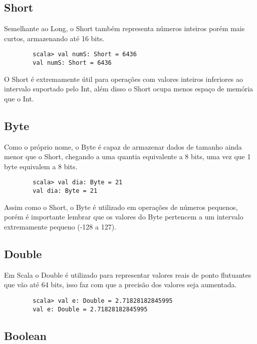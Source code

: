 	\subsection{Short}
	
	Semelhante ao Long, o Short tamb\'{e}m representa n\'{u}meros inteiros por\'{e}m mais curtos, armazenando at\'{e} 16 bits.
	
	\begin{lstlisting}
		scala> val numS: Short = 6436
		val numS: Short = 6436
	\end{lstlisting}

	O Short \'{e} extremamente útil para opera\c{c}\~{o}es com valores inteiros inferiores ao intervalo suportado pelo Int, al\'{e}m disso o Short ocupa menos espaço de mem\'{o}ria que o Int.
    
    \subsection{Byte}
    
    Como o próprio nome, o Byte \'{e} capaz de armazenar dados de tamanho ainda menor que o Short, chegando a uma quantia equivalente a 8 bits, uma vez que 1 byte equivalem a 8 bits.
    
    \begin{lstlisting}
    	scala> val dia: Byte = 21
    	val dia: Byte = 21
    \end{lstlisting}

	Assim como o Short, o Byte \'{e} utilizado em opera\c{c}\~{o}es de n\'{u}meros pequenos, por\'{e}m \'{e} importante lembrar que os valores do Byte pertencem a um intervalo extremamente pequeno (-128 a 127).
	
	\subsection{Double}
	
	Em Scala o Double \'{e} utilizado para representar valores reais de ponto flutuantes que vão at\'{e} 64 bits, isso faz com que a precis\~{a}o dos valores seja aumentada.
	
	\begin{lstlisting}
		scala> val e: Double = 2.71828182845995
		val e: Double = 2.71828182845995
	\end{lstlisting}
    
    \subsection{Boolean}
    
